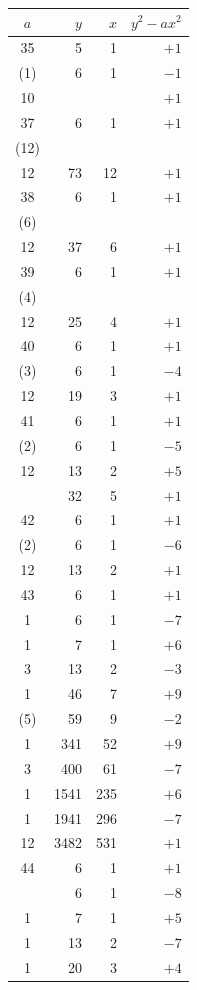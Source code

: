 \documentclass[11pt]{article}
\begin{document}
\begin{center}
\renewcommand{\arraystretch}{1.05}
\begin{tabular}{|c|r|r|r|}
\hline
$a$ & $y$ & $x$ & $y^2 - ax^2$ \\
\hline
35 & 5 & 1 & $+1$ \\
(1) & 6 & 1 & $-1$ \\
10 & & & $+1$ \\
\hline
37 & 6 & 1 & $+1$ \\
(12) & & & \\
12 & 73 & 12 & $+1$ \\
\hline
38 & 6 & 1 & $+1$ \\
(6) & & & \\
12 & 37 & 6 & $+1$ \\
\hline
39 & 6 & 1 & $+1$ \\
(4) & & & \\
12 & 25 & 4 & $+1$ \\
\hline
40 & 6 & 1 & $+1$ \\
(3) & 6 & 1 & $-4$ \\
12 & 19 & 3 & $+1$ \\
\hline
41 & 6 & 1 & $+1$ \\
(2) & 6 & 1 & $-5$ \\
12 & 13 & 2 & $+5$ \\
 & 32 & 5 & $+1$ \\
\hline
42 & 6 & 1 & $+1$ \\
(2) & 6 & 1 & $-6$ \\
12 & 13 & 2 & $+1$ \\
\hline
43 & 6 & 1 & $+1$ \\
1 & 6 & 1 & $-7$ \\
1 & 7 & 1 & $+6$ \\
3 & 13 & 2 & $-3$ \\
1 & 46 & 7 & $+9$ \\
(5) & 59 & 9 & $-2$ \\
1 & 341 & 52 & $+9$ \\
3 & 400 & 61 & $-7$ \\
1 & 1541 & 235 & $+6$ \\
1 & 1941 & 296 & $-7$ \\
12 & 3482 & 531 & $+1$ \\
\hline
44 & 6 & 1 & $+1$ \\
 & 6 & 1 & $-8$ \\
1 & 7 & 1 & $+5$ \\
1 & 13 & 2 & $-7$ \\
1 & 20 & 3 & $+4$ \\

\end{tabular}
\end{center}
\end{document}
